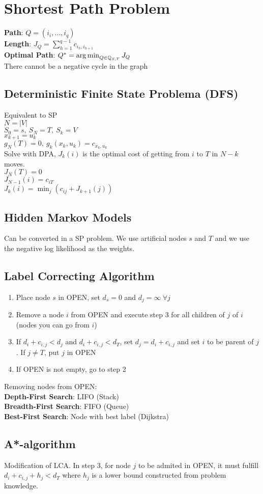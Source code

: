 \section*{Shortest Path Problem}
\textbf{Path}: $Q = (i_i, \dots, i_q)$\\
\textbf{Length}: $J_Q = \sum_{h=1}^{q-1}c_{i_h,i_{h+1}}$\\
\textbf{Optimal Path}: $Q^* = \operatorname*{arg\,min}_{Q\in \mathbb{Q}_{S,T}}J_Q$\\
There cannot be a negative cycle in the graph
\subsection*{Deterministic Finite State Problema (DFS)}
Equivalent to SP\\
$N = |V|$\\
$S_0 = s,\ S_N = T,\ S_k = V$\\
$x_{k+1} = u_k$\\
$g_N(T) = 0, \ g_k(x_k,u_k) = c_{x_k,u_k}$\\
Solve with DPA, $J_k(i)$ is the optimal cost of getting from $i$ to $T$ in $N-k$ moves.\\
$J_N(T) = 0$\\
$J_{N-1}(i) = c_{iT}$\\
$J_k(i) = \min_j(c_{ij} + J_{k+1}(j))$
\subsection*{Hidden Markov Models}
Can be converted in a SP problem. We use artificial nodes $s$ and $T$ and we use the negative log likelihood as the weights.
\subsection*{Label Correcting Algorithm}
\begin{enumerate}[wide, labelwidth=!, labelindent=0pt]
	\item Place node $s$ in OPEN, set $d_s=0$ and $d_j = \infty \ \forall j$
	\item Remove a node $i$ from OPEN and execute step 3 for all children of $j$ of $i$ (nodes you can go from $i$)
	\item If $d_i + c_{i,j} < d_j$ and $d_i + c_{i,j} < d_T$, set $d_j = d_i + c_{i,j}$ and set $i$ to be parent of $j$. If $j \neq T$, put $j$ in OPEN
	\item If OPEN is not empty, go to step 2
\end{enumerate}
Removing nodes from OPEN:\\
\textbf{Depth-First Search}: LIFO (Stack)\\
\textbf{Breadth-First Search}: FIFO (Queue)\\
\textbf{Best-First Search}: Node with best label (Dijkstra)
\subsection*{A*-algorithm}
Modification of LCA. In step 3, for node $j$ to be admited in OPEN, it must fulfill\\
$d_i + c_{i,j} + h_j < d_T$ where $h_j$ is a lower bound constructed from problem knowledge.